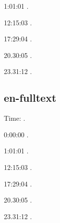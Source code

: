 \documentclass[italian,english]{article}
\begin{document}
1:01:01   . 

12:15:03   . 

17:29:04   . 

20.30:05   .

23.31:12   .
\subsection{en-fulltext}
Time: \DTMcurrenttime.

0:00:00  .

1:01:01   . 

12:15:03   . 

17:29:04   . 

20.30:05   .

23.31:12   .
\end{document}
